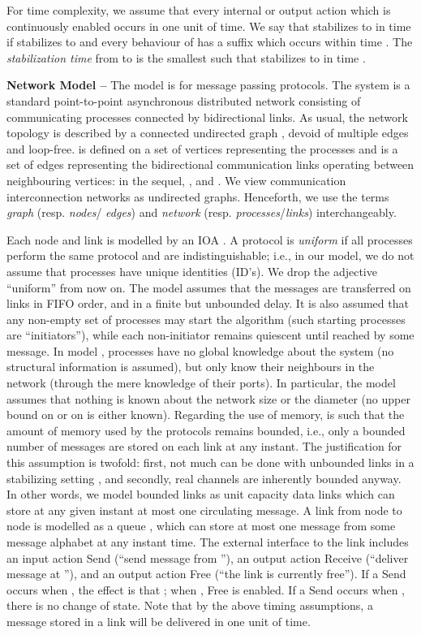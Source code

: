 \documentclass[10pt]{article}
\begin{document}
For time complexity, we assume that every internal or output action which
is continuously enabled occurs in one unit of time. We say that 
stabilizes to  in time  if  stabilizes to  and every behaviour
of  has a suffix which occurs within time . The {\em stabilization
time} from  to  is the smallest  such that  stabilizes to 
in time .

{\bf Network Model --} The model  is for message passing
protocols. The system is a standard point-to-point asynchronous
distributed network consisting of  communicating processes
connected by  bidirectional links. As usual, the network topology
is described by a connected undirected graph , devoid of
multiple edges and loop-free.  is defined on a set  of vertices
representing the processes and  is a set of edges representing the
bidirectional communication links operating between neighbouring
vertices: in the sequel, , and .  We view
communication interconnection networks as undirected graphs.
Henceforth, we use the terms {\em graph} (resp. {\em nodes}/{\em
edges}) and {\em network} (resp. {\em processes}/{\em links})
interchangeably.

Each node and link is modelled by an IOA \cite{APVD94,Varg94}.  A
protocol is {\em uniform} if all processes perform the same protocol
and are indistinguishable; i.e., in our model, we do not assume that
processes have unique identities (ID's). We drop the adjective
``uniform'' from now on. The model  assumes that the messages
are transferred on links in FIFO order, and in a finite but unbounded
delay.  It is also assumed that any non-empty set of processes may
start the algorithm (such starting processes are ``initiators''),
while each non-initiator remains quiescent until reached by some
message.  In model , processes have no global knowledge about
the system (no structural information is assumed), but only know their
neighbours in the network (through the mere knowledge of their ports).
In particular, the model  assumes that nothing is known about
the network size  or the diameter  (no upper bound on  or
on  is either known). Regarding the use of memory,  is
such that the amount of memory used by the protocols remains bounded,
i.e., only a bounded number of messages are stored on each link at any
instant. The justification for this assumption is twofold: first, not
much can be done with unbounded links in a stabilizing setting
\cite{APVD94,DoIM91a,Varg94}, and secondly, real channels are
inherently bounded anyway. In other words, we model bounded links as
unit capacity data links which can store at any given instant at most
one circulating message. A link  from node  to node  is
modelled as a queue , which can store at most one message from
some message alphabet  at any instant time. The external
interface to the link  includes an input action {\sc
Send} (``send message  from ''), an output action {\sc
Receive} (``deliver message  at ''), and an output
action {\sc Free} (``the link  is currently free'').  If a
{\sc Send} occurs when , the effect is
that ; when , {\sc Free} is
enabled.  If a {\sc Send} occurs when , there is no change of state. Note that by the above timing
assumptions, a message stored in a link will be delivered in one unit
of time.
\end{document}
